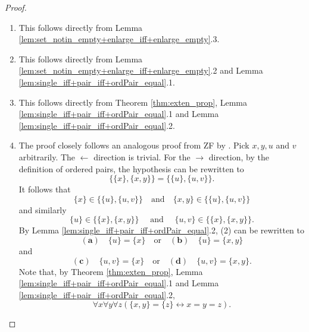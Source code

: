 \begin{proof}
    \leanok
    \leavevmode
    \begin{enumerate}
        \item This follows directly from Lemma \ref{lem:set_notin_empty+enlarge_iff+enlarge_empty}.3.
        \item This follows directly from Lemma \ref{lem:set_notin_empty+enlarge_iff+enlarge_empty}.2 and Lemma \ref{lem:single_iff+pair_iff+ordPair_equal}.1.
        \item This follows directly from Theorem \ref{thm:exten_prop}, Lemma \ref{lem:single_iff+pair_iff+ordPair_equal}.1 and Lemma \ref{lem:single_iff+pair_iff+ordPair_equal}.2.
        \item  The proof closely follows an analogous proof from ZF by \cite{enderton1977elements}.
        Pick $x,y,u$ and $v$ arbitrarily. The $\leftarrow$ direction is trivial.
        For the $\rightarrow$ direction, by the definition of ordered pairs, the hypothesis can be rewritten to
        \begin{equation*}
            \{\{x\}, \{x,y\}\} = \{\{u\}, \{u,v\}\}.
        \end{equation*}
        It follows that
        \begin{equation}
            \{x\} \in \{\{u\}, \{u,v\}\}\quad\text{and}\quad \{x,y\} \in \{\{u\}, \{u,v\}\}
        \end{equation}
        and similarly
        \begin{equation}
            \{u\} \in \{\{x\}, \{x,y\}\}\quad\text{ and }\quad \{u,v\} \in \{\{x\}, \{x,y\}\}.
        \end{equation}
        By Lemma \ref{lem:single_iff+pair_iff+ordPair_equal}.2, (2) can be rewritten to
        \begin{equation*}
            (\textbf{a})\quad\{u\}=\{x\}\quad\text{or}\quad (\textbf{b})\quad\{u\}=\{x,y\}
        \end{equation*}
        and
        \begin{equation*}
            (\textbf{c})\quad\{u,v\}=\{x\}\quad\text{or}\quad (\textbf{d})\quad\{u,v\}=\{x,y\}.
        \end{equation*}
        Note that, by Theorem \ref{thm:exten_prop}, Lemma \ref{lem:single_iff+pair_iff+ordPair_equal}.1 and Lemma \ref{lem:single_iff+pair_iff+ordPair_equal}.2,
        \begin{equation}
        \forall x \forall y \forall z (\{x,y\} = \{z\} \leftrightarrow x = y =z).
        \end{equation}

\end{enumerate}
\end{proof}

